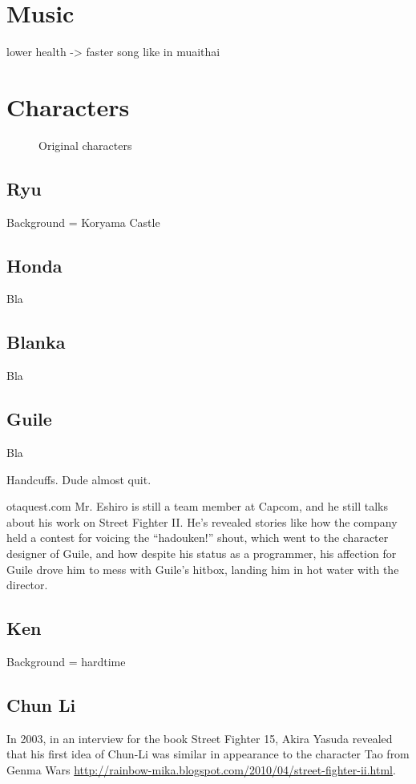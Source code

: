 \section{Music}
lower health -> faster song like in muaithai

\section{Characters}

\begin{figure}[H]
\caption*{Original characters}
\end{figure}


\subsection{Ryu} 
Background = Koryama Castle
\subsection{Honda} Bla
\subsection{Blanka} Bla
\subsection{Guile} Bla

Handcuffs. Dude almost quit. 

\begin{q}{otaquest.com\cite{otaquest}}
Mr. Eshiro is still a team member at Capcom, and he still talks about his work on Street Fighter II. He’s revealed stories like how the company held a contest for voicing the “hadouken!” shout, which went to the character designer of Guile, and how despite his status as a programmer, his affection for Guile drove him to mess with Guile’s hitbox, landing him in hot water with the director.
\end{q}

\subsection{Ken}
Background = hardtime
\subsection{Chun Li} 

In 2003, in an interview for the book Street Fighter 15, Akira Yasuda revealed that his first idea of Chun-Li was similar in appearance to the character Tao from Genma Wars \url{http://rainbow-mika.blogspot.com/2010/04/street-fighter-ii.html}.

